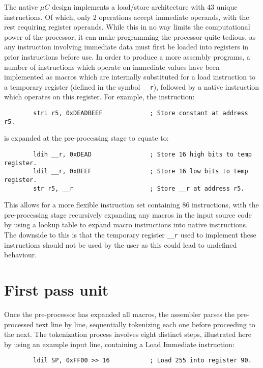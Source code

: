 \documentclass[12pt,twoside]{report}
\begin{document}
The native $\mu C$ design implements a load/store architecture with 43
unique instructions. Of which, only 2 operations accept immediate
operands, with the rest requiring register operands. While this in no
way limits the computational power of the processor, it can make
programming the processor quite tedious, as any instruction involving
immediate data must first be loaded into registers in prior
instructions before use. In order to produce a more assembly programs,
a number of instructions which operate on immediate values have been
implemented as macros which are internally substituted for a load
instruction to a temporary register (defined in the symbol
\texttt{\_\_r}), followed by a native instruction which operates on
this register. For example, the instruction:

\begin{verbatim}
        stri r5, 0xDEADBEEF             ; Store constant at address r5.
\end{verbatim}

is expanded at the pre-processing stage to equate to:

\begin{verbatim}
        ldih __r, 0xDEAD                ; Store 16 high bits to temp register.
        ldil __r, 0xBEEF                ; Store 16 low bits to temp register.
        str r5, __r                     ; Store __r at address r5.
\end{verbatim}

This allows for a more flexible instruction set containing 86
instructions, with the pre-processing stage recursively expanding any
macros in the input source code by using a lookup table to expand
macro instructions into native instructions. The downside to this is
that the temporary register \texttt{\_\_r} used to implement these
instructions should not be used by the user as this could lead to
undefined behaviour.

\section{First pass unit}

Once the pre-processor has expanded all macros, the assembler parses
the pre-processed text line by line, sequentially tokenizing each one
before proceeding to the next. The tokenization process involves eight
distinct steps, illustrated here by using an example input line,
containing a Load Immediate instruction:

\begin{verbatim}
        ldil SP, 0xFF00 >> 16           ; Load 255 into register 90.
\end{verbatim}
\end{document}
